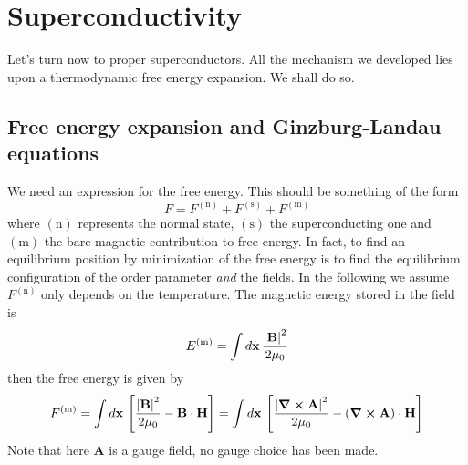 \section{Superconductivity}

Let's turn now to proper superconductors. All the mechanism we developed lies upon a thermodynamic free energy expansion. We shall do so. 

\subsection{Free energy expansion and Ginzburg-Landau equations}\label{subsec:free energy expansion and Ginzburg-Landau equations}

We need an expression for the free energy. This should be something of the form
\[
    F = F^{(\mathrm{n})} + F^{(\mathrm{s})} + F^{(\mathrm{m})}
\]
where ${(\mathrm{n})}$ represents the normal state, ${(\mathrm{s})}$ the superconducting one and ${(\mathrm{m})}$ the bare magnetic contribution to free energy. In fact, to find an equilibrium position by minimization of the free energy is to find the equilibrium configuration of the order parameter \textit{and} the fields. In the following we assume $F^{(\mathrm{n})}$ only depends on the temperature. The magnetic energy stored in the field is
\[
    E^{(\mathrm{m})} = \int d\mathbf{x} \, \frac{\abs{\mathbf{B}}^2}{2\mu_0}
\]
then the free energy is given by
\[
    F^{(\mathrm{m})} = \int d\mathbf{x} \, \left[{ \frac{\abs{\mathbf{B}}^2}{2\mu_0} - \mathbf{B} \cdot \mathbf{H} }\right] = \int d\mathbf{x} \, \left[{ \frac{\abs{\curl\mathbf{A}}^2}{2\mu_0} - \left({ \curl\mathbf{A} }\right) \cdot \mathbf{H} }\right]
\]
Note that here $\mathbf{A}$ is a gauge field, no gauge choice has been made.

